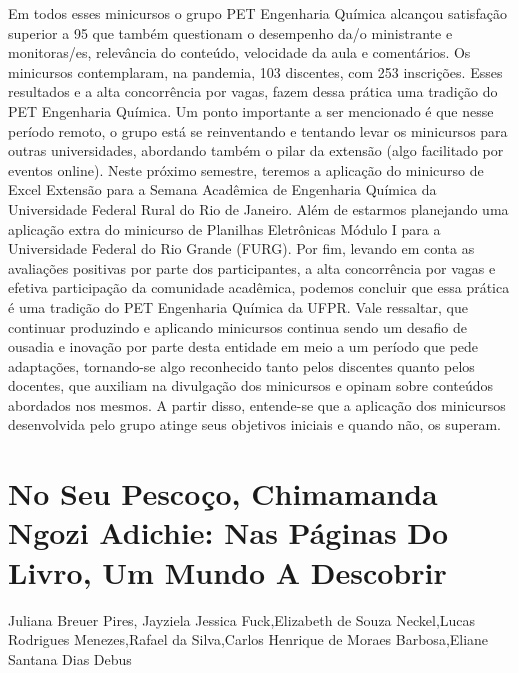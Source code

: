 Em todos esses minicursos o grupo PET Engenharia Química alcançou satisfação
superior a 95%
que também questionam o desempenho da/o ministrante e monitoras/es, relevância do conteúdo,
velocidade da aula e comentários. Os minicursos contemplaram, na pandemia, 103 discentes,
com 253 inscrições. Esses resultados e a alta concorrência por vagas, fazem dessa prática uma
tradição do PET Engenharia Química. Um ponto importante a ser mencionado é que nesse
período remoto, o grupo está se reinventando e tentando levar os minicursos para outras
universidades, abordando também o pilar da extensão (algo facilitado por eventos online). Neste
próximo semestre, teremos a aplicação do minicurso de Excel Extensão para a Semana
Acadêmica de Engenharia Química da Universidade Federal Rural do Rio de Janeiro. Além de
estarmos planejando uma aplicação extra do minicurso de Planilhas Eletrônicas Módulo I para a
Universidade Federal do Rio Grande (FURG).
Por fim, levando em conta as avaliações positivas por parte dos participantes, a alta
concorrência por vagas e efetiva participação da comunidade acadêmica, podemos concluir que
essa prática é uma tradição do PET Engenharia Química da UFPR. Vale ressaltar, que continuar
produzindo e aplicando minicursos continua sendo um desafio de ousadia e inovação por parte
desta entidade em meio a um período que pede adaptações, tornando-se algo reconhecido tanto
pelos discentes quanto pelos docentes, que auxiliam na divulgação dos minicursos e opinam
sobre conteúdos abordados nos mesmos. A partir disso, entende-se que a aplicação dos
minicursos desenvolvida pelo grupo atinge seus objetivos iniciais e quando não, os superam.




\section*{No Seu Pescoço, Chimamanda Ngozi Adichie: Nas Páginas Do Livro, Um  Mundo A Descobrir}

Juliana Breuer Pires, Jayziela Jessica Fuck,Elizabeth de  Souza Neckel,Lucas Rodrigues Menezes,Rafael da Silva,Carlos Henrique de Moraes Barbosa,Eliane Santana Dias Debus

